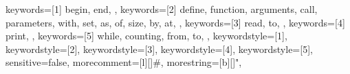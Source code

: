 {
    keywords=[1]{
        begin, end, 
    },
    keywords=[2]{
        define, function, arguments, call, parameters, with, set, as, of, size, by, at,
    },
    keywords=[3]{
      read, to,
    },
    keywords=[4]{
        print,
    },
    keywords=[5]{
        while, counting, from, to,
    },
    keywordstyle=[1]\color{brown},
    keywordstyle=[2]\color{RoyalBlue},
    keywordstyle=[3]\color{ForestGreen},
    keywordstyle=[4]\color{BrickRed},
    keywordstyle=[5]\color{RoyalPurple},
    sensitive=false,
    morecomment=[l][\color{gray}]{\#},    
    morestring=[b][\color{Sepia}]",
}